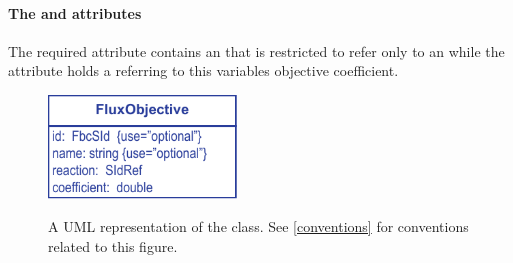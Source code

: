 \paragraph{The  and  attributes}
The required  attribute contains an  that is
restricted to refer only to an \SBML \Reaction while the 
attribute holds a  referring to this variables objective
coefficient.

\begin{figure}[h]
  \centering
  \includegraphics[width=5cm]{images/fbc_uml_fobj.pdf}\\
  \caption{A UML representation of the \FBCPackage \FluxObjective class. See
  \ref{conventions} for conventions related to this figure.}
  \label{fig:fbc_uml_fobj}
\end{figure}
